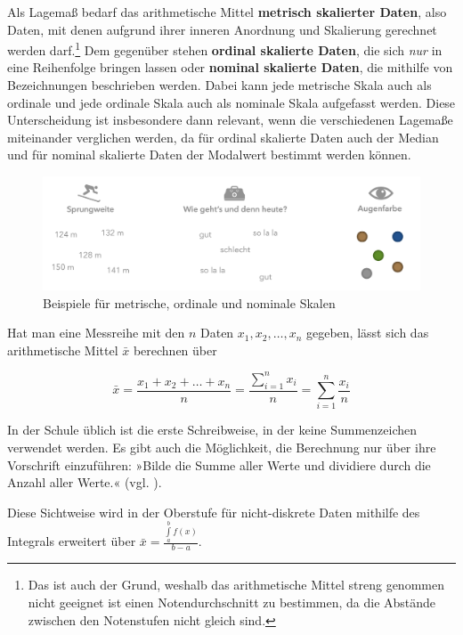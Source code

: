\documentclass[
]{scrbook}
\theoremstyle{definition}
\theoremstyle{definition}
\theoremstyle{definition}
\theoremstyle{definition}
\theoremstyle{remark}
\begin{document}
Als Lagemaß bedarf das arithmetische Mittel \textbf{metrisch skalierter Daten}, also Daten, mit denen aufgrund ihrer inneren Anordnung und Skalierung gerechnet werden darf.\footnote{Das ist auch der Grund, weshalb das arithmetische Mittel streng genommen nicht geeignet ist einen Notendurchschnitt zu bestimmen, da die Abstände zwischen den Notenstufen nicht gleich sind.} Dem gegenüber stehen \textbf{ordinal skalierte Daten}, die sich \emph{nur} in eine Reihenfolge bringen lassen oder \textbf{nominal skalierte Daten}, die mithilfe von Bezeichnungen beschrieben werden. Dabei kann jede metrische Skala auch als ordinale und jede ordinale Skala auch als nominale Skala aufgefasst werden. Diese Unterscheidung ist insbesondere dann relevant, wenn die verschiedenen Lagemaße miteinander verglichen werden, da für ordinal skalierte Daten auch der Median und für nominal skalierte Daten der Modalwert bestimmt werden können.

\begin{figure}

{\centering \includegraphics[width=0.9\linewidth]{pictures/B-Skalen} 

}

\caption{Beispiele für metrische, ordinale und nominale Skalen}\label{fig:Skalen}
\end{figure}

Hat man eine Messreihe mit den \(n\) Daten \(x_1,x_2,\ldots,x_n\) gegeben, lässt sich das arithmetische Mittel \(\bar{x}\) berechnen über

\[\bar{x} = \frac{x_1+x_2+\ldots + x_n}{n} = \frac{\sum\limits_{i=1}^n x_i}{n} = \sum_{i=1}^n \frac{x_i}{n}\]

In der Schule üblich ist die erste Schreibweise, in der keine Summenzeichen verwendet werden. Es gibt auch die Möglichkeit, die Berechnung nur über ihre Vorschrift einzuführen: »Bilde die Summe aller Werte und dividiere durch die Anzahl aller Werte.« (vgl. ).

Diese Sichtweise wird in der Oberstufe für nicht-diskrete Daten mithilfe des Integrals erweitert über \(\bar{x} = \frac{\int\limits_a^b f(x)}{b-a}\).
\end{document}
